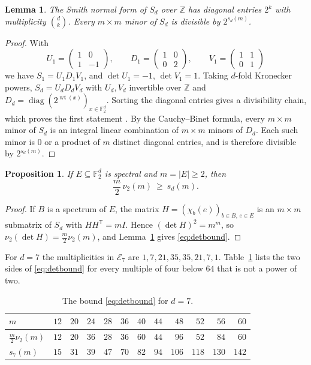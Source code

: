 \documentclass[11pt]{amsart}
\newtheorem{lemma}[theorem]{Lemma}
\newtheorem{proposition}[theorem]{Proposition}
\theoremstyle{definition}
\theoremstyle{remark}
\numberwithin{equation}{section}
\numberwithin{table}{section}
\newcommand{\F}{\mathbb{F}}
\newcommand{\Z}{\mathbb{Z}}
\newcommand{\wt}{\operatorname{wt}}
\newcommand{\diag}{\operatorname{diag}}
\newcommand{\T}{\mathsf{T}}
\begin{document}
\begin{lemma}\label{lem:smith}
The Smith normal form of $S_d$ over $\Z$ has diagonal entries $2^k$ with multiplicity $\binom dk$. Every $m\times m$ minor of $S_d$ is divisible by $2^{s_d(m)}$.
\end{lemma}

\begin{proof}
With
\[
U_1=\begin{pmatrix}1&0\\1&-1\end{pmatrix},\qquad
D_1=\begin{pmatrix}1&0\\0&2\end{pmatrix},\qquad
V_1=\begin{pmatrix}1&1\\0&1\end{pmatrix}
\]
we have $S_1=U_1D_1V_1$, and $\det U_1=-1$, $\det V_1=1$. Taking $d$-fold Kronecker powers, $S_d=U_dD_dV_d$ with $U_d,V_d$ invertible over $\Z$ and $D_d=\diag(2^{\wt(x)})_{x\in\F_2^d}$. Sorting the diagonal entries gives a divisibility chain, which proves the first statement \cite{New72}. By the Cauchy--Binet formula, every $m\times m$ minor of $S_d$ is an integral linear combination of $m\times m$ minors of $D_d$. Each such minor is $0$ or a product of $m$ distinct diagonal entries, and is therefore divisible by $2^{s_d(m)}$.
\end{proof}

\begin{proposition}\label{prop:detbound}
If $E\subseteq\F_2^d$ is spectral and $m=|E|\ge2$, then
\begin{equation}\label{eq:detbound}
\frac m2\,\nu_2(m)\ \ge\ s_d(m).
\end{equation}
\end{proposition}

\begin{proof}
If $B$ is a spectrum of $E$, the matrix $H=(\chi_b(e))_{b\in B,\,e\in E}$ is an $m\times m$ submatrix of $S_d$ with $HH^{\T}=mI$. Hence $(\det H)^2=m^m$, so $\nu_2(\det H)=\frac m2\nu_2(m)$, and Lemma~\ref{lem:smith} gives \eqref{eq:detbound}.
\end{proof}

For $d=7$ the multiplicities in $\mathcal{E}_7$ are $1,7,21,35,35,21,7,1$. Table~\ref{tab:smith} lists the two sides of \eqref{eq:detbound} for every multiple of four below $64$ that is not a power of two.

\begin{table}[ht]
\centering
\caption{The bound \eqref{eq:detbound} for $d=7$.}\label{tab:smith}
\begin{tabular}{lrrrrrrrrrrr}
\toprule
$m$ & $12$ & $20$ & $24$ & $28$ & $36$ & $40$ & $44$ & $48$ & $52$ & $56$ & $60$\\
\midrule
$\frac m2\nu_2(m)$ & $12$ & $20$ & $36$ & $28$ & $36$ & $60$ & $44$ & $96$ & $52$ & $84$ & $60$\\
$s_7(m)$ & $15$ & $31$ & $39$ & $47$ & $70$ & $82$ & $94$ & $106$ & $118$ & $130$ & $142$\\
\bottomrule
\end{tabular}
\end{table}
\end{document}
